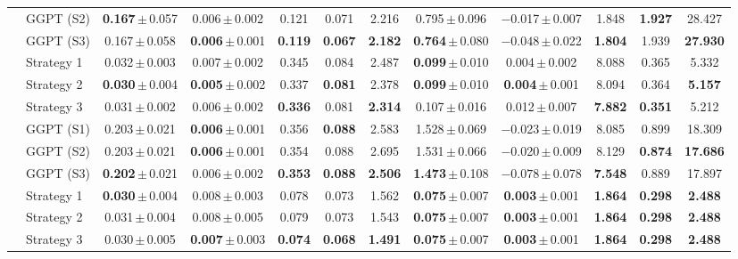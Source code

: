\begin{table}[!htb]
{\begin{tabular}{ll ccccc ccccc}
 & GGPT (S2) & \textbf{0.167}\,$\pm$\,0.057 & 0.006\,$\pm$\,0.002 & 0.121 & 0.071 & 2.216 & 0.795\,$\pm$\,0.096 & $-$0.017\,$\pm$\,0.007 & 1.848 & \textbf{1.927} & 28.427 \\
 & GGPT (S3) & 0.167\,$\pm$\,0.058 & \textbf{0.006}\,$\pm$\,0.001 & \textbf{0.119} & \textbf{0.067} & \textbf{2.182} & \textbf{0.764}\,$\pm$\,0.080 & $\mathbf{-0.048}$\,$\pm$\,0.022 & \textbf{1.804} & 1.939 & \textbf{27.930} \\
\midrule
\addlinespace[0.15em]
\multirow{6}{*}{VGGT}
 & Strategy 1 & 0.032\,$\pm$\,0.003 & 0.007\,$\pm$\,0.002 & 0.345 & 0.084 & 2.487 & \textbf{0.099}\,$\pm$\,0.010 & 0.004\,$\pm$\,0.002 & 8.088 & 0.365 & 5.332 \\
 & Strategy 2 & \textbf{0.030}\,$\pm$\,0.004 & \textbf{0.005}\,$\pm$\,0.002 & 0.337 & \textbf{0.081} & 2.378 & \textbf{0.099}\,$\pm$\,0.010 & \textbf{0.004}\,$\pm$\,0.001 & 8.094 & 0.364 & \textbf{5.157} \\
 & Strategy 3 & 0.031\,$\pm$\,0.002 & 0.006\,$\pm$\,0.002 & \textbf{0.336} & 0.081 & \textbf{2.314} & 0.107\,$\pm$\,0.016 & 0.012\,$\pm$\,0.007 & \textbf{7.882} & \textbf{0.351} & 5.212 \\
\cmidrule(l){2-12}
 & GGPT (S1) & 0.203\,$\pm$\,0.021 & \textbf{0.006}\,$\pm$\,0.001 & 0.356 & \textbf{0.088} & 2.583 & 1.528\,$\pm$\,0.069 & $-$0.023\,$\pm$\,0.019 & 8.085 & 0.899 & 18.309 \\
 & GGPT (S2) & 0.203\,$\pm$\,0.021 & \textbf{0.006}\,$\pm$\,0.001 & 0.354 & 0.088 & 2.695 & 1.531\,$\pm$\,0.066 & $-$0.020\,$\pm$\,0.009 & 8.129 & \textbf{0.874} & \textbf{17.686} \\
 & GGPT (S3) & \textbf{0.202}\,$\pm$\,0.021 & 0.006\,$\pm$\,0.002 & \textbf{0.353} & \textbf{0.088} & \textbf{2.506} & \textbf{1.473}\,$\pm$\,0.108 & $\mathbf{-0.078}$\,$\pm$\,0.078 & \textbf{7.548} & 0.889 & 17.897 \\
\midrule
\addlinespace[0.15em]
\multirow{6}{*}{Pi3}
 & Strategy 1 & \textbf{0.030}\,$\pm$\,0.004 & 0.008\,$\pm$\,0.003 & 0.078 & 0.073 & 1.562 & \textbf{0.075}\,$\pm$\,0.007 & \textbf{0.003}\,$\pm$\,0.001 & \textbf{1.864} & \textbf{0.298} & \textbf{2.488} \\
 & Strategy 2 & 0.031\,$\pm$\,0.004 & 0.008\,$\pm$\,0.005 & 0.079 & 0.073 & 1.543 & \textbf{0.075}\,$\pm$\,0.007 & \textbf{0.003}\,$\pm$\,0.001 & \textbf{1.864} & \textbf{0.298} & \textbf{2.488} \\
 & Strategy 3 & 0.030\,$\pm$\,0.005 & \textbf{0.007}\,$\pm$\,0.003 & \textbf{0.074} & \textbf{0.068} & \textbf{1.491} & \textbf{0.075}\,$\pm$\,0.007 & \textbf{0.003}\,$\pm$\,0.001 & \textbf{1.864} & \textbf{0.298} & \textbf{2.488} \\

\end{tabular}}
\end{table}
